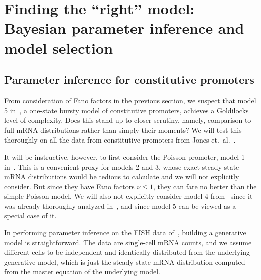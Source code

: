 \section{Finding the ``right'' model: Bayesian parameter inference and model selection}
\subsection{Parameter inference for constitutive promoters}

From consideration of Fano factors in the previous section, we suspect that
model 5 in~, a one-state bursty model of constitutive
promoters, achieves a Goldilocks level of complexity. Does this stand up to
closer scrutiny, namely, comparison to full mRNA distributions rather than
simply their moments? We will test this thoroughly on all the data from
constitutive promoters from Jones et.\ al.~\cite{Jones2014}.

It will be instructive, however, to first consider the Poisson promoter, model 1
in~. This is a convenient proxy for models 2 and 3,
whose exact steady-state mRNA distributions would be tedious to calculate and we
will not explicitly consider. But since they have Fano factors $\nu\le 1$, they
can fare no better than the simple Poisson model. We will also not explicitly
consider model 4 from~ since it was already thoroughly
analyzed in~\cite{Razo-Mejia2020}, and since model 5 can be viewed as a special
case of it.

In performing parameter inference on the FISH data of~\cite{Jones2014}, building
a generative model is straightforward. The data are single-cell mRNA counts, and
we assume different cells to be independent and identically distributed from the
underlying generative model, which is just the steady-state mRNA distribution
computed from the master equation of the underlying model.

